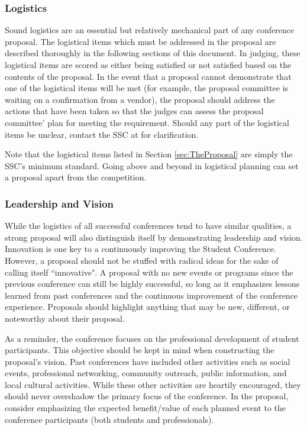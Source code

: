 \documentclass[12pt]{article}
\begin{document}
\subsubsection{Logistics}
Sound logistics are an essential but relatively mechanical part of any conference
proposal. The logistical items which must be addressed in the proposal are described
thoroughly in the following sections of this document. In judging, these logistical items
are scored as either being satisfied or not satisfied based on the contents of the proposal.
In the event that a proposal cannot demonstrate that one of the logistical items
will be met (for example, the proposal committee is waiting on a confirmation from a vendor), the proposal should
address the actions that have been taken so that the judges can assess the proposal committee' plan for meeting the
requirement. Should any part of the logistical items be unclear, contact the SSC at for clarification.

Note that the logistical items listed in Section \ref{sec:TheProposal} are simply the SSC’s minimum
standard. Going above and beyond in logistical planning can set a proposal apart
from the competition.

\subsubsection{Leadership and Vision} \label{sec:LandV}
While the logistics of all successful conferences tend to have similar qualities, a strong proposal will also distinguish itself by demonstrating
leadership and vision.
Innovation is one key to a continuously improving the Student Conference. However, a proposal should not be stuffed with radical ideas for the sake of
calling itself ``innovative".
A proposal with no new events or programs since the previous conference can still be highly successful, so long as it emphasizes lessons learned from past conferences and the continuous improvement of the conference experience. 
Proposals should highlight anything that may be new, different, or noteworthy about their proposal.

As a reminder, the conference focuses on the professional
development of student participants. This objective should be kept in mind when constructing the proposal's vision. Past conferences have included
other activities such as social events, professional networking, community outreach,
public information, and local cultural activities. While these other activities are heartily
encouraged, they should never overshadow the primary focus of the conference. In the
proposal, consider emphasizing the expected benefit/value of each planned event to the
conference participants (both students and professionals).
\end{document}
